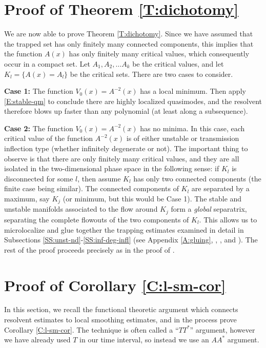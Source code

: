 \documentclass[twoside, final]{amsart}
\theoremstyle{definition}
\numberwithin{equation}{section}
\begin{document}
\section{Proof of Theorem \ref{T:dichotomy}}

We are now able to prove Theorem \ref{T:dichotomy}.  Since we have
assumed that the trapped set has only finitely many connected
components, this implies that the function $A(x)$ has only finitely
many critical values, which consequently occur in a compact set.  Let
$A_1, A_2, \ldots A_k$ be the critical values, and let $K_l = \{ A(x)
= A_l \}$ be the critical sets.  
There are two cases to consider.  

{\bf Case 1:}  The function $V_0(x) = A^{-2}(x)$ has a local minimum.  Then
apply  \eqref{E:stable-qm} to conclude there are highly localized
quasimodes, and the resolvent therefore blows up faster than any
polynomial (at least along a subsequence).  

{\bf Case 2:}  The function $V_0(x) = A^{-2}(x)$ has no minima.  In this case,
each critical value of the function $A^{-2}(x)$ is of either unstable
or transmission inflection type (whether infinitely degenerate or
not).  The important thing to observe is that there are only finitely
many critical values, and they are all isolated in the two-dimensional
phase space in the following sense: if $K_l$ is disconnected for some $l$,
then assume $K_l$ has only two connected components (the finite case
being similar).  The connected components of $K_l$ are separated by a maximum, say
$K_j$ (or
minimum, but this would be Case 1).  The stable and unstable manifolds
associated to the flow around $K_j$ form a {\it global} separatrix,
separating the complete flowouts of the two components of $K_l$.  This
allows us to microlocalize and glue together the trapping estimates examined
in detail in Subsections \ref{SS:unst-nd}-\ref{SS:inf-deg-infl} (see
Appendix \ref{A:gluing}, 
\cite{Chr-disp-1}, \cite{ChMe-lsm}, and \cite{DaVa-gluing}).  The rest of the proof
proceeds precisely as in the proof of \cite[Theorem 2]{ChWu-lsm}.

\section{Proof of Corollary \ref{C:l-sm-cor}}
\label{S:l-sm-pf-sec}

In this section, we recall the functional theoretic argument which
connects resolvent estimates to local smoothing estimates, and in the
process prove Corollary \ref{C:l-sm-cor}.  The technique is often
called a ``$T T^*$'' argument, however we have already used $T$ in our
time interval, so instead we use an $A A^*$ argument.  
\end{document}
